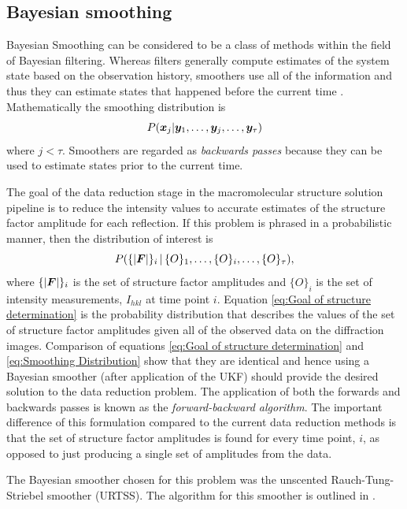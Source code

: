 \subsection{Bayesian smoothing}
\label{sub:Bayesian Smoothing}
Bayesian Smoothing can be considered to be a class of methods within the field of Bayesian filtering.
Whereas filters generally compute estimates of the system state based on the observation history, smoothers use all of the information and thus they can estimate states that happened before the current time \cite{sarkka2013}.
Mathematically the smoothing distribution is
\begin{equation}
    P(\boldsymbol{x}_j | \boldsymbol{y}_1, \ldots, \boldsymbol{y}_j, \ldots, \boldsymbol{y}_{\tau})
    \label{eq:Smoothing Distribution}
\end{equation}
where $j < \tau$.
Smoothers are regarded as \textit{backwards passes} because they can be used to estimate states prior to the current time.

The goal of the data reduction stage in the macromolecular structure solution pipeline is to reduce the intensity values to accurate estimates of the structure factor amplitude for each reflection.
If this problem is phrased in a probabilistic manner, then the distribution of interest is
\begin{equation}
    P(\{|\boldsymbol{F}|\}_i \,|\, \{O\}_1, \ldots, \{O\}_i,\ldots, \{O\}_{\tau}),
    \label{eq:Goal of structure determination}
\end{equation}
where $\{|\boldsymbol{F}|\}_i$ is the set of structure factor amplitudes and $\{O\}_i$ is the set of intensity measurements, $I_{hkl}$ at time point $i$.
Equation \ref{eq:Goal of structure determination} is the probability distribution that describes the values of the set of structure factor amplitudes given all of the observed data on the diffraction images.
Comparison of equations \ref{eq:Goal of structure determination} and \ref{eq:Smoothing Distribution} show that they are identical and hence using a Bayesian smoother (after application of the UKF) should provide the desired solution to the data reduction problem.
The application of both the forwards and backwards passes is known as the \textit{forward-backward algorithm}.
The important difference of this formulation compared to the current data reduction methods is that the set of structure factor amplitudes is found for every time point, $i$, as opposed to just producing a single set of amplitudes from the data.

The Bayesian smoother chosen for this problem was the unscented Rauch-Tung-Striebel smoother (URTSS).
The algorithm for this smoother is outlined in \cite{sarkka2008unscented}.

